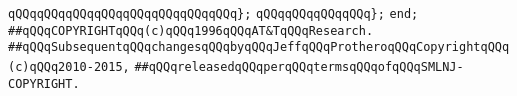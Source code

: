 \verb|qQQqqQQqqQQqqQQqqQQqqQQqqQQqqQQq};|\newline
\verb|qQQqqQQqqQQqqQQq};|\newline
\verb|end;|\newline
\newline
\verb|##qQQqCOPYRIGHTqQQq(c)qQQq1996qQQqAT&TqQQqResearch.|\newline
\verb|##qQQqSubsequentqQQqchangesqQQqbyqQQqJeffqQQqProtheroqQQqCopyrightqQQq(c)qQQq2010-2015,|\newline
\verb|##qQQqreleasedqQQqperqQQqtermsqQQqofqQQqSMLNJ-COPYRIGHT.|\newline

